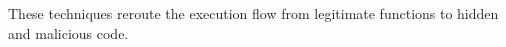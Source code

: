 These techniques reroute the execution flow from legitimate functions to hidden and malicious code.
